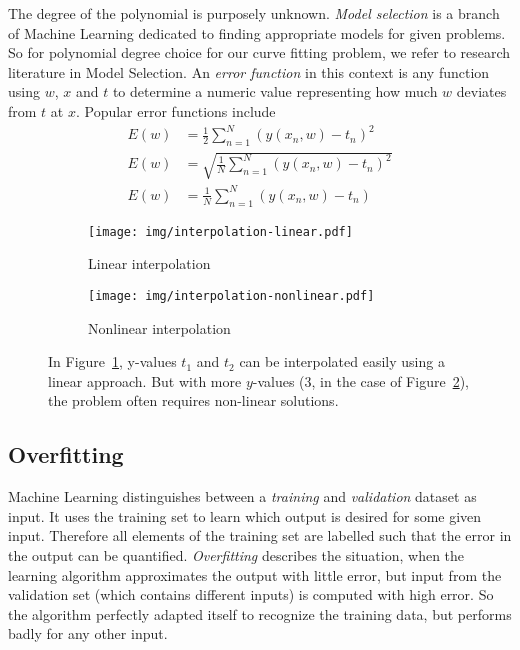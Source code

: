 The degree of the polynomial is purposely unknown.
\emph{Model selection} is a branch of Machine Learning dedicated to finding appropriate models for given problems.
So for polynomial degree choice for our curve fitting problem, we refer to research literature in Model Selection. 
An \emph{error function} in this context is any function using $w$, $x$ and $t$ to determine a numeric value representing how much $w$ deviates from $t$ at $x$.
Popular error functions include
\begin{align}
  E(w) &= \frac12 \sum_{n=1}^N \left(y(x_n, w) - t_n\right)^2 \tag{Mean squared error, MSE} \\
  E(w) &= \sqrt{\frac{1}{N} \sum_{n=1}^N (y(x_n, w) - t_n)^2} \tag{Root mean square, RMS} \\
  E(w) &= \frac1N \sum_{n=1}^N (y(x_n, w) - t_n)              \tag{Mean signed deviation, MSD}
\end{align}

\begin{figure}[!h]
  \begin{center}
    \begin{subfigure}[b]{0.45\textwidth}
      \texttt{[image: img/interpolation-linear.pdf]}
      \caption{Linear interpolation}
      \label{fig:linear-interpolation}
    \end{subfigure}%
    \begin{subfigure}[b]{0.45\textwidth}
      \texttt{[image: img/interpolation-nonlinear.pdf]}
      \caption{Nonlinear interpolation}
      \label{fig:nonlinear-interpolation}
    \end{subfigure}
    \caption{
      In Figure~\ref{fig:linear-interpolation}, y-values $t_1$ and $t_2$ can be interpolated
      easily using a linear approach. But with more $y$-values (3, in the case of Figure~\ref{fig:nonlinear-interpolation}),
      the problem often requires non-linear solutions.
    }
    \label{fig:interpolation}
  \end{center}
\end{figure}

\subsection{Overfitting}
\label{sec:bp-overfitting}
%
Machine Learning distinguishes between a \emph{training} and \emph{validation} dataset as input.
It uses the training set to learn which output is desired for some given input.
Therefore all elements of the training set are labelled such that the error in the output can be quantified.
\emph{Overfitting} describes the situation, when the learning algorithm approximates the output with little error,
but input from the validation set (which contains different inputs) is computed with high error.
So the algorithm perfectly adapted itself to recognize the training data, but performs badly for any other input.

